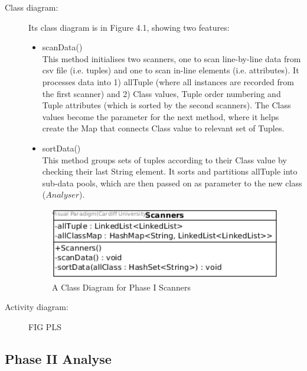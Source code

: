 \begin{description}
\item[Class diagram: ] 

Its class diagram is in Figure 4.1, showing two features:
\begin{itemize}
	\item{scanData()} \\
	This method initialises two scanners, one to scan line-by-line data from csv file (i.e. tuples) and one to scan in-line elements (i.e. attributes).
	It processes data into 1) allTuple (where all instances are recorded from the first scanner) and 2) Class values, Tuple order numbering and Tuple attributes (which is sorted by the second scanners).
	The Class values become the parameter for the next method, where it helps create the Map that connects Class value to relevant set of Tuples.
	\item{sortData()} \\
	This method groups sets of tuples according to their Class value by checking their last String element. It sorts and partitions allTuple into sub-data pools, which are then passed on as parameter to the new class ($Analyser$).
	
\end{itemize}

\begin{figure}[!htbp]
    \centering
    \includegraphics[width=4in]{figures/class_scanners}
    \caption[A Class Diagram for Phase I Scanners]{A Class Diagram for Phase I Scanners}
    \label{fig:figure4_1}
\end{figure}

\item[Activity diagram: ] 

FIG PLS

\end{description}

\subsection{Phase II Analyse}

